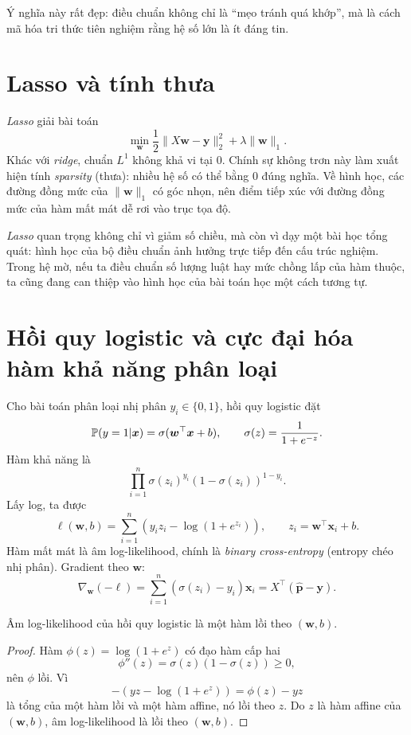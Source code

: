 Ý nghĩa này rất đẹp: điều chuẩn không chỉ là ``mẹo tránh quá khớp'', mà là cách mã hóa tri thức tiên nghiệm rằng hệ số lớn là ít đáng tin.

\section{Lasso và tính thưa}

\emph{Lasso} giải bài toán
\[
\min_{\bm{w}} \frac{1}{2}\|X\bm{w}-\bm{y}\|_2^2 + \lambda \|\bm{w}\|_1.
\]
Khác với \emph{ridge}, chuẩn $L^1$ không khả vi tại 0. Chính sự không trơn này làm xuất hiện tính \emph{sparsity} (thưa): nhiều hệ số có thể bằng 0 đúng nghĩa. Về hình học, các đường đồng mức của \(\|\bm{w}\|_1\) có góc nhọn, nên điểm tiếp xúc với đường đồng mức của hàm mất mát dễ rơi vào trục tọa độ.

\emph{Lasso} quan trọng không chỉ vì giảm số chiều, mà còn vì dạy một bài học tổng quát: hình học của bộ điều chuẩn ảnh hưởng trực tiếp đến cấu trúc nghiệm. Trong hệ mờ, nếu ta điều chuẩn số lượng luật hay mức chồng lấp của hàm thuộc, ta cũng đang can thiệp vào hình học của bài toán học một cách tương tự.

\section{Hồi quy logistic và cực đại hóa hàm khả năng phân loại}

Cho bài toán phân loại nhị phân \(y_i\in\{0,1\}\), hồi quy logistic đặt
\[
\mathbb{P}(y=1|\bm{x}) = \sigma(\bm{w}^\top \bm{x}+b),\qquad \sigma(z)=\frac{1}{1+e^{-z}}.
\]
Hàm khả năng là
\[
\prod_{i=1}^n \sigma(z_i)^{y_i}(1-\sigma(z_i))^{1-y_i}.
\]
Lấy log, ta được
\[
\ell(\bm{w},b)=\sum_{i=1}^n \left(y_i z_i - \log(1+e^{z_i})\right),
\qquad z_i=\bm{w}^\top\bm{x}_i+b.
\]
Hàm mất mát là âm log-likelihood, chính là \emph{binary cross-entropy} (entropy chéo nhị phân). Gradient theo \(\bm{w}\):
\[
\nabla_{\bm{w}}(-\ell)=\sum_{i=1}^n (\sigma(z_i)-y_i)\bm{x}_i
=X^\top(\hat{\bm{p}}-\bm{y}).
\]

\begin{proposition}
Âm log-likelihood của hồi quy logistic là một hàm lồi theo \((\bm{w},b)\).
\end{proposition}

\begin{proof}
Hàm \(\phi(z)=\log(1+e^z)\) có đạo hàm cấp hai
\[
\phi''(z)=\sigma(z)(1-\sigma(z))\ge 0,
\]
nên \(\phi\) lồi. Vì
\[
-(yz-\log(1+e^z))=\phi(z)-yz
\]
là tổng của một hàm lồi và một hàm affine, nó lồi theo \(z\). Do \(z\) là hàm affine của \((\bm{w},b)\), âm log-likelihood là lồi theo \((\bm{w},b)\).
\end{proof}

